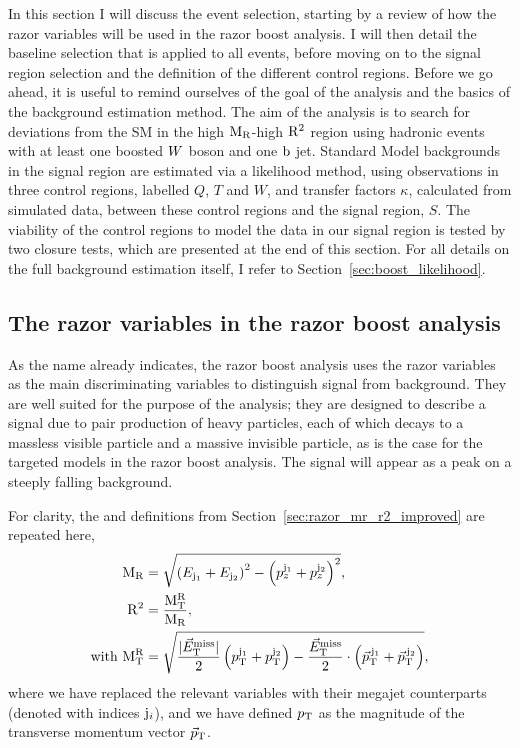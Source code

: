 In this section I will discuss the event selection, starting by a review of 
how the razor variables will be used in the razor boost analysis. I will then detail the
baseline selection that is applied to all events, before moving on to the signal region selection
and the definition of the different control regions. 
Before we go ahead, it is useful to remind ourselves of the goal of the analysis and the basics
of the background estimation method. 
The aim of the analysis is to search for deviations from the SM in the high $\mathrm{M_R}$-high
$\mathrm{R^2}$ region using hadronic events with at least one boosted $W$ boson and one $\mathrm{b}$ jet.
Standard Model backgrounds in the signal region are estimated via a likelihood method, using
observations in three control regions, labelled $Q$, $T$ and $W$, and transfer factors
$\kappa$, calculated from simulated data, between these control regions and the signal region,
$S$. 
The viability of the control regions to model the data in our signal region is tested by
two closure tests, which are presented at the end of this section.
For all details on the full background estimation itself, I refer to
Section~\ref{sec:boost_likelihood}. 

\subsection{The razor variables in the razor boost analysis \label{sec:boost_event_razor}}

As the name already indicates, the razor boost analysis uses the razor variables as the main
discriminating variables to distinguish signal from background. They are well suited for the purpose
of the analysis; they are
designed to describe a signal due to pair production of heavy particles, each of which decays to a
massless visible particle and a massive invisible particle, as is the case for the targeted models
in the razor boost analysis. The signal will appear as a peak on a steeply falling background. 

For clarity, the \mr and \rsq definitions from Section~\ref{sec:razor_mr_r2_improved} are repeated
here,  
\begin{align}
  \mathrm{M_R} &= \sqrt{\left( E_{{\rm j}_1} + E_{{\rm j}_2}\right)^2 - \left( p_{z}^{{\rm j}_1} +
p_{z}^{{\rm j}_2} \right)^2} ,\\
  \mathrm{R^2} &= \frac{\mathrm{M_T^R}}{\mathrm{M_R}} ,\\
  \textrm{with } \mathrm{M_T^R} &= \sqrt{\frac{|{\vec E}_{\mathrm{T}}^{\text{miss}}|}{2} \left(p_{\mathrm{T}}^{{\rm j}_1} + p_{\mathrm{T}}^{{\rm j}_2}
\right) - \frac{{\vec E}_{\mathrm{T}}^{\text{miss}}}{2} \cdot \left({\vec p}_{\mathrm{T}}^{\,{\rm j}_1} + {\vec p}_{\mathrm{T}}^{\,{\rm j}_2}
\right)} ,
\end{align}
where we have replaced the relevant variables with their megajet counterparts (denoted with indices
${\rm j}_i$), and we have defined $p_{\mathrm{T}}$ as the magnitude of the transverse momentum vector
${\vec p}_{\mathrm{T}}$. 

